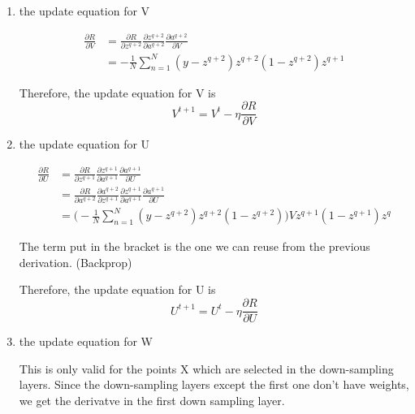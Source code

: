 \documentclass[11pt]{article}
\theoremstyle{definition}
\begin{document}
\begin{enumerate}
\item the update equation for V

\begin{equation*}
\begin{split}
\frac{\partial R}{\partial V} & = \frac{\partial R}{\partial z^{q+2}}
				\frac{\partial z^{q+2}} {\partial a^{q+2}}
				\frac{\partial a^{q+2}} {\partial V} \\
				& = - \frac{1}{N} \sum_{n=1}^{N} (y - z^{q+2})
					z^{q+2}(1-z^{q+2}) z^{q+1}
\end{split}
\end{equation*}

Therefore, the update equation for V is
\begin{equation*}
V^{t+1} = V^t - \eta \frac{\partial R}{\partial V}
\end{equation*}

\item the update equation for U

\begin{equation*}
\begin{split}
\frac{\partial R}{\partial U} & = \frac{\partial R}{\partial z^{q+1}}
				\frac{\partial z^{q+1}} {\partial a^{q+1}}
				\frac{\partial a^{q+1}} {\partial U} \\
				& = \frac{\partial R}{\partial a^{q+2}}
				\frac{\partial a^{q+2}} {\partial z^{q+1}}
				\frac{\partial z^{q+1}} {\partial a^{q+1}}
				\frac{\partial a^{q+1}} {\partial U} \\
				& = \bigg( - \frac{1}{N} \sum_{n=1}^{N} (y - z^{q+2})
					z^{q+2}(1-z^{q+2}) \bigg)
					V
					z^{q+1}(1-z^{q+1}) z^q
\end{split}
\end{equation*}

The term put in the bracket is the one we can reuse from the previous derivation. (Backprop)

Therefore, the update equation for U is
\begin{equation*}
U^{t+1} = U^t - \eta \frac{\partial R}{\partial U}
\end{equation*}


\item the update equation for W

This is only valid for the points X which are selected in the down-sampling
layers. Since the down-sampling layers except the first one don't have weights,
we get the derivatve in the first down sampling layer.


\end{enumerate}
\end{document}
